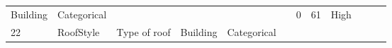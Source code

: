 \documentclass[11pt]{article}
\begin{document}
\begin{longtable}[]{@{}llllllllllll@{}}
\begin{minipage}[t]{0.04\columnwidth}
Building\strut
\end{minipage} & \begin{minipage}[t]{0.04\columnwidth}\raggedright\strut
Categorical\strut
\end{minipage} & \begin{minipage}[t]{0.04\columnwidth}\raggedright\strut
\strut
\end{minipage} & \begin{minipage}[t]{0.04\columnwidth}\raggedright\strut
\strut
\end{minipage} & \begin{minipage}[t]{0.04\columnwidth}\raggedright\strut
\strut
\end{minipage} & \begin{minipage}[t]{0.04\columnwidth}\raggedright\strut
\strut
\end{minipage} & \begin{minipage}[t]{0.04\columnwidth}\raggedright\strut
0\strut
\end{minipage} & \begin{minipage}[t]{0.04\columnwidth}\raggedright\strut
61\strut
\end{minipage} & \begin{minipage}[t]{0.04\columnwidth}\raggedright\strut
High\strut
\end{minipage}\tabularnewline
\begin{minipage}[t]{0.04\columnwidth}\raggedright\strut
22\strut
\end{minipage} & \begin{minipage}[t]{0.04\columnwidth}\raggedright\strut
RoofStyle\strut
\end{minipage} & \begin{minipage}[t]{0.04\columnwidth}\raggedright\strut
Type of roof\strut
\end{minipage} & \begin{minipage}[t]{0.04\columnwidth}\raggedright\strut
Building\strut
\end{minipage} & \begin{minipage}[t]{0.04\columnwidth}\raggedright\strut
Categorical\strut
\end{minipage} & \begin{minipage}[t]{0.04\columnwidth}\raggedright\strut
\strut
\end{minipage} & \begin{minipage}[t]{0.04\columnwidth}\raggedright\strut
\strut
\end{minipage} & \begin{minipage}[t]{0.04\columnwidth}\raggedright\strut

\end{minipage}
\end{longtable}
\end{document}
